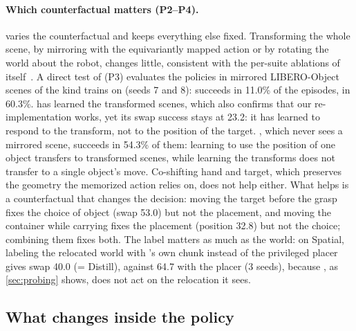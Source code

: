 \paragraph{Which counterfactual matters (P2--P4).}
 varies the counterfactual and keeps everything else fixed.
Transforming the whole scene, by mirroring with the equivariantly mapped action or by rotating the world about the robot,
changes little, consistent with the per-suite ablations of \ect itself~\cite{chen2026ect}.
A direct test of (P3) evaluates the policies in mirrored LIBERO-Object scenes of the kind \ect trains on (seeds 7 and 8):
\pizf succeeds in 11.0\% of the episodes, \ect in 60.3\%. \ect has learned the transformed scenes, which also confirms
that our re-implementation works, yet its swap success stays at 23.2: it has learned to respond to the transform, not to the
position of the target. \ours, which never sees a mirrored scene, succeeds in 54.3\% of them: learning to use the position
of one object transfers to transformed scenes, while learning the transforms does not transfer to a single object's move.
Co-shifting hand and target, which preserves the geometry the memorized action relies on, does not help either.
What helps is a counterfactual that changes the decision: moving the target before the grasp fixes the choice of object
(swap 53.0) but not the placement, and moving the container while carrying fixes the placement (position 32.8) but not the
choice; combining them fixes both.
The label matters as much as the world: on Spatial, labeling the relocated world with \pizf's own chunk instead of the
privileged placer gives swap 40.0 (= Distill), against 64.7 with the placer (3 seeds), because \pizf, as
\cref{sec:probing} shows, does not act on the relocation it sees.

\subsection{What changes inside the policy}
\label{sec:exp:mech}

